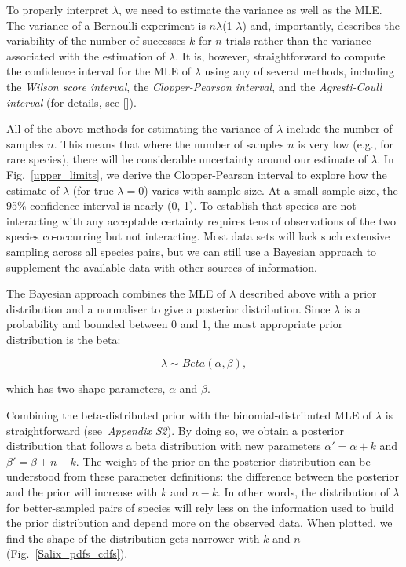 \documentclass[12pt]{article}
\begin{document}
\begin{spacing}{2.0}
    To properly interpret $\lambda$, we need to estimate the variance as well as the MLE. The variance of a Bernoulli experiment is $n\lambda$(1-$\lambda$) and, importantly, describes the variability of the number of successes $k$ for $n$ trials rather than the variance associated with the estimation of $\lambda$. It is, however, straightforward to compute the confidence interval for the MLE of $\lambda$ using any of several methods, including the \emph{Wilson score interval}, the \emph{Clopper-Pearson interval}, and the \emph{Agresti-Coull interval} (for details, see [\citealp{Brown2001}]). 


    All of the above methods for estimating the variance of $\lambda$ include the number of samples $n$. This means that where the number of samples $n$ is very low (e.g., for rare species), there will be considerable uncertainty around our estimate of $\lambda$. In Fig.~\ref{upper_limits}, we derive the Clopper-Pearson interval to explore how the estimate of $\lambda$ (for true $\lambda = 0$) varies with sample size. At a small sample size, the 95\% confidence interval is nearly (0, 1). To establish that species are not interacting with any acceptable certainty requires tens of observations of the two species co-occurring but not interacting. Most data sets will lack such extensive sampling across all species pairs, but we can still use a Bayesian approach to supplement the available data with other sources of information.


    The Bayesian approach combines the MLE of $\lambda$ described above with a prior distribution and a normaliser to give a posterior distribution. Since $\lambda$ is a probability and bounded between 0 and 1, the most appropriate prior distribution is the beta: 

    \begin{equation}
          \lambda \sim Beta(\alpha,\beta) , \label{prior}
        \end{equation}

        \noindent which has two shape parameters, $\alpha$ and $\beta$. 

    Combining the beta-distributed prior with the binomial-distributed MLE of $\lambda$ is straightforward (see~\emph{Appendix S2}). By doing so, we obtain a posterior distribution that follows a beta distribution with new parameters $\alpha'= \alpha+k$ and $\beta'=\beta+n-k$. The weight of the prior on the posterior distribution can be understood from these parameter definitions: the difference between the posterior and the prior will increase with $k$ and $n-k$. In other words, the distribution of $\lambda$ for better-sampled pairs of species will rely less on the information used to build the prior distribution and depend more on the observed data. When plotted, we find the shape of the distribution gets narrower with $k$ and $n$ (Fig.~\ref{Salix_pdfs_cdfs}). 



\end{spacing}
\end{document}
